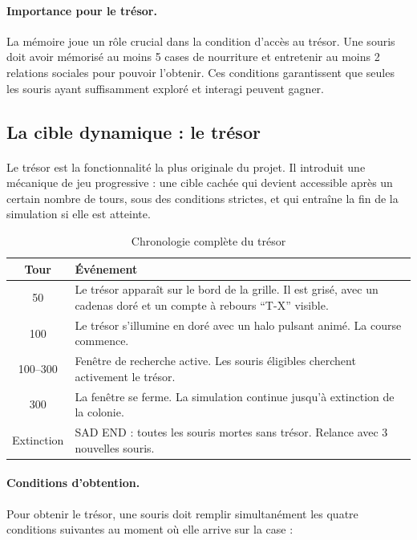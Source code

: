 \paragraph{Importance pour le trésor.} La mémoire joue un rôle crucial dans la condition d'accès au trésor. Une souris doit avoir mémorisé au moins 5 cases de nourriture et entretenir au moins 2 relations sociales pour pouvoir l'obtenir. Ces conditions garantissent que seules les souris ayant suffisamment exploré et interagi peuvent gagner.

\bigskip

\subsection{La cible dynamique : le trésor}

\paragraph{} Le trésor est la fonctionnalité la plus originale du projet. Il introduit une mécanique de jeu progressive : une cible cachée qui devient accessible après un certain nombre de tours, sous des conditions strictes, et qui entraîne la fin de la simulation si elle est atteinte.

\begin{table}[h!]
\centering
\renewcommand{\arraystretch}{1.5}
\begin{tabular}{|c|p{9cm}|}
\hline
\textbf{Tour} & \textbf{Événement} \\
\hline
50 & Le trésor apparaît sur le bord de la grille. Il est grisé, avec un cadenas doré et un compte à rebours ``T-X'' visible. \\
\hline
100 & Le trésor s'illumine en doré avec un halo pulsant animé. La course commence. \\
\hline
100--300 & Fenêtre de recherche active. Les souris éligibles cherchent activement le trésor. \\
\hline
300 & La fenêtre se ferme. La simulation continue jusqu'à extinction de la colonie. \\
\hline
Extinction & SAD END : toutes les souris mortes sans trésor. Relance avec 3 nouvelles souris. \\
\hline
\end{tabular}
\caption{Chronologie complète du trésor}
\label{tab:tresor_chrono}
\end{table}

\paragraph{Conditions d'obtention.} Pour obtenir le trésor, une souris doit remplir simultanément les quatre conditions suivantes au moment où elle arrive sur la case :

